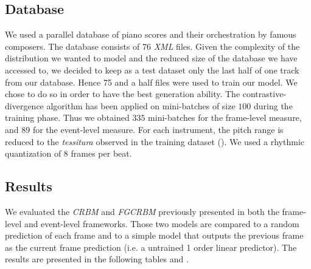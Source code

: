 \documentclass[letterpaper]{article}
\begin{document}

\subsection{Database}
We used a parallel database of piano scores and their orchestration by famous composers. The database consists of 76 \textit{XML} files. Given the complexity of the distribution we wanted to model and the reduced size of the database we have accessed to, we decided to keep as a test dataset only the last half of one track from our database. Hence 75 and a half files were used to train our model. We chose to do so in order to have the best generation ability.
The contrastive-divergence algorithm has been applied on mini-batches of size $100$ during the training phase. Thus we obtained $335$ mini-batches for the frame-level measure, and $89$ for the event-level measure.
For each instrument, the pitch range is reduced to the \textit{tessitura} observed in the training dataset (\label{sec:data_representation}). We used a rhythmic quantization of 8 frames per beat.

\subsection{Results}
We evaluated the \textit{CRBM} and \textit{FGCRBM} previously presented  in both the frame-level and event-level frameworks. Those two models are compared to a random prediction of each frame and to a simple model that outputs the previous frame as the current frame prediction (i.e. a untrained 1 order linear predictor). The results are presented in the following tables  and .
\end{document}
